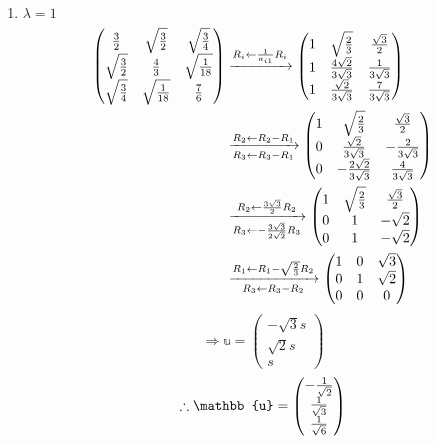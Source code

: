 \begin{enumerate}[wide, labelindent = 0pt, label = (\roman*)]
\item $\lambda = 1$
\begin{align*}
    \begin{pmatrix}
        \frac{3}{2}        & \sqrt{\frac{3}{2}} & \sqrt{\frac{3}{4}} \\
        \sqrt{\frac{3}{2}} & \frac{4}{3}        & \sqrt{\frac{1}{18}}    \\
        \sqrt{\frac{3}{4}} & \sqrt{\frac{1}{18}}    & \frac{7}{6}
    \end{pmatrix}
    &\xrightarrow{R_i \leftarrow \frac{1}{a_{i1}} R_i} \begin{pmatrix}
        1 & \sqrt{\frac{2}{3}}          & \frac{\sqrt{3}}{2} \\
        1 & \frac{4\sqrt{2}}{3\sqrt{3}} & \frac{1}{3\sqrt{3}}    \\
        1 & \frac{\sqrt{2}}{3\sqrt{3}}  & \frac{7}{3\sqrt{3}}
    \end{pmatrix} \\
    &\xrightarrow[R_3 \leftarrow R_3 - R_1]{R_2 \leftarrow R_2 - R_1} \begin{pmatrix}
        1 & \sqrt{\frac{2}{3}}           & \frac{\sqrt{3}}{2}   \\
        0 & \frac{\sqrt{2}}{3\sqrt{3}}   & -\frac{2}{3\sqrt{3}} \\
        0 & -\frac{2\sqrt{2}}{3\sqrt{3}} & \frac{4}{3\sqrt{3}}
    \end{pmatrix} \\
    &\xrightarrow[R_3 \leftarrow -\frac{3\sqrt{3}}{2\sqrt{2}} R_3]{R_2 \leftarrow \frac{3\sqrt{3}}{2} R_2} \begin{pmatrix}
        1 & \sqrt{\frac{2}{3}} & \frac{\sqrt{3}}{2} \\
        0 & 1                  & -\sqrt{2}          \\
        0 & 1                  & -\sqrt{2}
    \end{pmatrix} \\
    &\xrightarrow[R_3 \leftarrow R_3 - R_2]{R_1 \leftarrow R_1 - \sqrt{\frac{2}{3}}R_2} \begin{pmatrix}
        1 & 0 & \sqrt{3} \\
        0 & 1 & \sqrt{2} \\
        0 & 0 & 0
    \end{pmatrix}
\end{align*}
\[
    \Rightarrow \mathbb{u} = \begin{pmatrix}
        -\sqrt{3}s \\ \sqrt{2}s \\ s
    \end{pmatrix}
\]
\[
    \therefore \mathbb{u} = \begin{pmatrix}
        -\inv{\sqrt{2}} \\ \inv{\sqrt{3}} \\ \inv{\sqrt{6}}
    \end{pmatrix}
\]


\end{enumerate}
